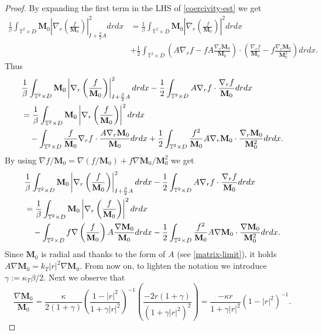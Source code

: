 \documentclass[a4paper,12pt, reqno]{amsart}
\newcommand{\T}{\mathbb{T}}
\newcommand{\M}{\mathbf{M}}
\renewcommand{\k}{\kappa}
\begin{document}
         \begin{proof}
             By expanding the first term in the LHS of \eqref{coercivity-est} we get 
\begin{align*}
     \frac{1}{\beta}\int_{\T^2 \times D} \M_0 \left| \nabla_r \left(\frac{f}{\M_0}\right)\right|_{I+ \frac{\beta}{2}A}^2 drdx  &= \frac{1}{\beta}\int_{\T^2 \times D} \M_0 \left| \nabla_r \left(\frac{f}{\M_0}\right)\right|^2 drdx \\ &+ \frac{1}{2}\int_{\T^2 \times D}  \left(A\nabla_r f - fA\frac{\nabla_r \M_0}{\M_0}\right)\cdot \left( \frac{\nabla_r f}{\M_0} - f\frac{\nabla_r \M_0}{\M_0^2}\right)drdx.
\end{align*}
Thus 
\begin{align}
     &\frac{1}{\beta}\int_{\T^2 \times D} \M_0 \left| \nabla_r \left(\frac{f}{\M_0}\right)\right|_{I+ \frac{\beta}{2}A}^2 drdx - \frac{1}{2}\int_{\T^2 \times D} A \nabla_r f \cdot \frac{\nabla_r f}{\M_0}drdx \notag\\ &= \frac{1}{\beta}\int_{\T^2 \times D} \M_0 \left| \nabla_r \left(\frac{f}{\M_0}\right)\right|^2 drdx \notag\\ &\quad- \int_{\T^2 \times D} \frac{f}{\M_0}\nabla_r f \cdot \frac{A\nabla_r\M_0}{\M_0} drdx + \frac{1}{2}\int_{\T^2 \times D} \frac{f^2}{\M_0}A\nabla_r\M_0\cdot \frac{\nabla_r\M_0 }{\M_0^2}drdx. \notag
\end{align}
By using $\nabla f/\M_0 = \nabla(f/\M_0) + f\nabla\M_0/\M_0^2 $  we get
\begin{align}
&\frac{1}{\beta}\int_{\T^2 \times D} \M_0 \left| \nabla_r \left(\frac{f}{\M_0}\right)\right|_{I+ \frac{\beta}{2}A}^2 drdx - \frac{1}{2}\int_{\T^2 \times D} A \nabla_r f \cdot \frac{\nabla_r f}{\M_0}drdx \notag\\ &= \frac{1}{\beta}\int_{\T^2 \times D} \M_0 \left| \nabla_r \left(\frac{f}{\M_0}\right)\right|^2 drdx \notag\\ &\quad - \int_{\T^2 \times D} f\nabla \left( \frac{f}{\M_0}\right)A\frac{\nabla \M_0}{\M_0}drdx - \frac{1}{2}\int_{\T^2 \times D} \frac{f^2}{\M_0}A\nabla\M_0\cdot \frac{\nabla\M_0 }{\M_0^2}drdx \label{coerc-to-est}.
\end{align}
Since $\M_0$ is radial and thanks to the form of $A$ (see \eqref{matrix-limit}), it holds $A\nabla\M_0 = k_T|r|^2 \nabla \M_0$. From now on, to lighten the notation we introduce $\gamma := \k_T \beta/2$. Next we observe that 
$$\frac{\nabla \M_0}{\M_0}= \frac{\k}{2(1+\gamma)}\left(\frac{1-|r|^2}{1+\gamma |r|^2}\right)^{-1} \left(\frac{-2r(1+\gamma)}{(1+\gamma|r|^2)^2}\right)=\frac{-\k r}{1+\gamma |r|^2}(1-|r|^2)^{-1}.$$

\end{proof}
\end{document}
